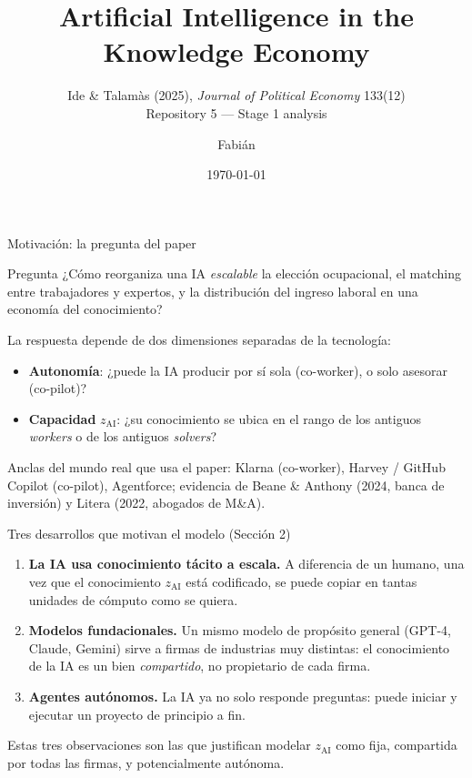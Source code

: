 \documentclass[aspectratio=169]{beamer}
\title{Artificial Intelligence in the Knowledge Economy}
\subtitle{Ide \& Talamàs (2025), \textit{Journal of Political Economy} 133(12) \\ \small Repository 5 --- Stage 1 analysis}
\author{Fabián}
\institute{AI and Economic Modeling --- Universidad del Pacífico}
\date{\today}
\newcommand{\zAI}{z_{\mathrm{AI}}}
\begin{document}
\maketitle

\begin{frame}{Motivación: la pregunta del paper}
\begin{block}{Pregunta}
¿Cómo reorganiza una IA \emph{escalable} la elección ocupacional, el matching entre trabajadores y expertos, y la distribución del ingreso laboral en una economía del conocimiento?
\end{block}
\vspace{0.3cm}
La respuesta depende de \alert{dos dimensiones separadas} de la tecnología:
\begin{itemize}
  \item \textbf{Autonomía}: ¿puede la IA producir por sí sola (co-worker), o solo asesorar (co-pilot)?
  \item \textbf{Capacidad} $\zAI$: ¿su conocimiento se ubica en el rango de los antiguos \emph{workers} o de los antiguos \emph{solvers}?
\end{itemize}
\vspace{0.3cm}
\footnotesize Anclas del mundo real que usa el paper: Klarna (co-worker), Harvey / GitHub Copilot (co-pilot), Agentforce; evidencia de Beane \& Anthony (2024, banca de inversión) y Litera (2022, abogados de M\&A).
\end{frame}

\begin{frame}{Tres desarrollos que motivan el modelo (Sección 2)}
\begin{enumerate}
  \item \textbf{La IA usa conocimiento tácito a escala.} A diferencia de un humano, una vez que el conocimiento $\zAI$ está codificado, se puede copiar en tantas unidades de cómputo como se quiera.
  \item \textbf{Modelos fundacionales.} Un mismo modelo de propósito general (GPT-4, Claude, Gemini) sirve a firmas de industrias muy distintas: el conocimiento de la IA es un bien \emph{compartido}, no propietario de cada firma.
  \item \textbf{Agentes autónomos.} La IA ya no solo responde preguntas: puede iniciar y ejecutar un proyecto de principio a fin.
\end{enumerate}
\vspace{0.3cm}
\footnotesize Estas tres observaciones son las que justifican modelar $\zAI$ como fija, compartida por todas las firmas, y potencialmente autónoma.
\end{frame}
\end{document}
